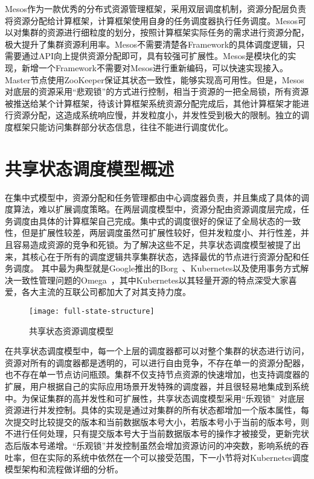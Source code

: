Mesos作为一款优秀的分布式资源管理框架，采用双层调度机制，资源分配层负责将资源分配给计算框架，计算框架使用自身的任务调度器执行任务调度。Mesos可以对集群的资源进行细粒度的划分，按照计算框架实际任务的需求进行资源分配，极大提升了集群资源利用率。Mesos不需要清楚各Framework的具体调度逻辑，只需要通过API向上提供资源分配即可，具有较强可扩展性。Mesos是模块化的实现，新增一个Framework不需要对Mesos进行重新编码，可以快速实现接入。Master节点使用ZooKeeper保证其状态一致性，能够实现高可用性。但是，Mesos对底层的资源采用“悲观锁”的方式进行控制，相当于资源的一把全局锁，所有资源被推送给某个计算框架，待该计算框架系统资源分配完成后，其他计算框架才能进行资源分配，这造成系统响应慢，并发粒度小，并发性受到极大的限制。独立的调度框架只能访问集群部分状态信息，往往不能进行调度优化。

\section{共享状态调度模型概述}
在集中式模型中，资源分配和任务管理都由中心调度器负责，并且集成了具体的调度算法，难以扩展调度策略。在两层调度模型中，资源分配由资源调度层完成，任务调度由具体的计算框架自己完成。集中式的调度很好的保证了全局状态的一致性，但是扩展性较差，两层调度虽然可扩展性较好，但并发粒度小、并行性差，并且容易造成资源的竞争和死锁。为了解决这些不足，共享状态调度模型被提了出来，其核心在于所有的调度逻辑共享集群状态，选择最优的节点进行资源分配和任务调度。
其中最为典型就是Google推出的Borg~\cite{KUB2015}、Kubernetes以及使用事务方式解决一致性管理问题的Omega~\cite{Burns2016Borg}，其中Kubernetes以其轻量开源的特点深受大家喜爱，各大主流的互联公司都加大了对其支持力度。

\begin{figure}[H] %
	\centering
	\texttt{[image: full-state-structure]}
	\caption{共享状态资源调度模型~\cite{Burns2016Borg}}
\end{figure}
在共享状态调度模型中，每一个上层的调度器都可以对整个集群的状态进行访问，资源对所有的调度器都是透明的，可以进行自由竞争，不存在单一的资源分配器，也不存在单一节点访问瓶颈。集群不仅支持节点资源的快速增加，也支持调度器的扩展，用户根据自己的实际应用场景开发特殊的调度器，并且很轻易地集成到系统中。为保证集群的高并发性和可扩展性，共享状态调度模型采用“乐观锁”~\cite{Halici1991An}对底层资源进行并发控制。具体的实现是通过对集群的所有状态都增加一个版本属性，每次提交时比较提交的版本和当前数据版本号大小，若版本号小于当前的版本号，则不进行任何处理，只有提交版本号大于当前数据版本号的操作才被接受，更新完状态后版本号递增。“乐观锁”并发控制虽然会增加资源访问的冲突数，影响系统的吞吐率，但在实际的系统中依然在一个可以接受范围，下一小节将对Kubernetes调度模型架构和流程做详细的分析。

